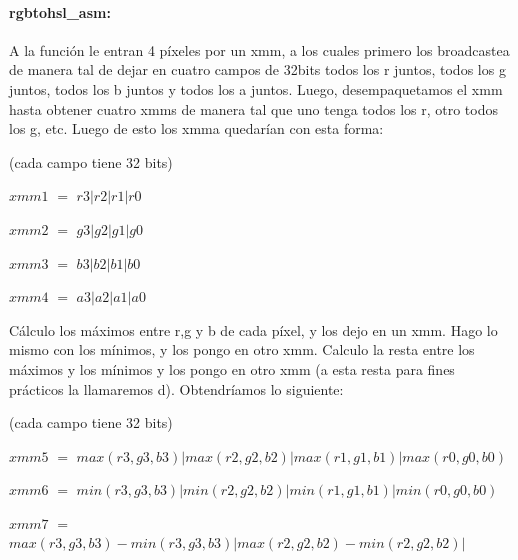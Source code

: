 \documentclass[a4paper]{article}
\begin{document}
\paragraph*{rgbtohsl_asm:}

A la función le entran 4 píxeles por un xmm, a los cuales primero los broadcastea de manera tal de dejar en cuatro campos de 32bits todos los r juntos, todos los g juntos, todos los b juntos y todos los a juntos. Luego, desempaquetamos el xmm hasta obtener cuatro xmms de manera tal que uno tenga todos los r, otro todos los g, etc. Luego de esto los xmma quedarían con esta forma:

\vspace*{0.3cm}

(cada campo tiene 32 bits)

\vspace*{0.3cm}

 $xmm1$ $=$ $r3|r2|r1|r0$

\vspace*{0.3cm}

 $xmm2$ $=$ $g3|g2|g1|g0$

\vspace*{0.3cm}

 $xmm3$ $=$ $b3|b2|b1|b0$

\vspace*{0.3cm}

 $xmm4$ $=$ $a3|a2|a1|a0$

\vspace*{0.3cm}

Cálculo los máximos entre r,g y b de cada píxel, y los dejo en un xmm. Hago lo mismo con los mínimos, y los pongo en otro xmm. Calculo la resta entre los máximos y los mínimos y los pongo en otro xmm (a esta resta para fines prácticos la llamaremos d). Obtendríamos lo siguiente:

 \vspace*{0.3cm}

(cada campo tiene 32 bits)

\vspace*{0.3cm}

 $xmm5$ $=$ $max(r3,g3,b3)|max(r2,g2,b2)|max(r1,g1,b1)|max(r0,g0,b0)$

\vspace*{0.3cm}

 $xmm6$ $=$ $min(r3,g3,b3)|min(r2,g2,b2)|min(r1,g1,b1)|min(r0,g0,b0)$

\vspace*{0.3cm}

 $xmm7$ $=$ $max(r3,g3,b3)-min(r3,g3,b3)|max(r2,g2,b2)-min(r2,g2,b2)|$
 
\end{document}
